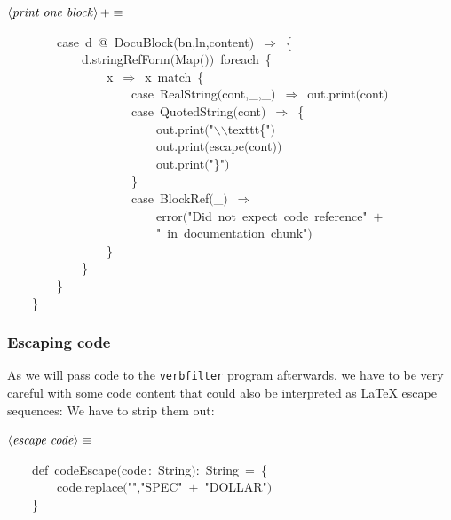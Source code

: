 \documentclass[a4paper,12pt]{article}
\begin{document}
$\left<\mbox{\emph{print one block}}\right>+\equiv$
\begin{program}~~~~~~~~{\vem case}~d~@~DocuBlock$($bn,ln,content$)$~$\Rightarrow$~{\small\{}
\\~~~~~~~~~~~~d.stringRefForm$($Map$($$)$$)$~foreach~{\small\{}
\\~~~~~~~~~~~~~~~~x~$\Rightarrow$~x~{\vem match}~{\small\{}
\\~~~~~~~~~~~~~~~~~~~~{\vem case}~RealString$($cont,\_,\_$)$~$\Rightarrow$~out.print$($cont$)$
\\~~~~~~~~~~~~~~~~~~~~{\vem case}~QuotedString$($cont$)$~$\Rightarrow$~{\small\{}
\\~~~~~~~~~~~~~~~~~~~~~~~~out.print$($"$\backslash$$\backslash$texttt{\small\{}"$)$
\\~~~~~~~~~~~~~~~~~~~~~~~~out.print$($escape$($cont$)$$)$
\\~~~~~~~~~~~~~~~~~~~~~~~~out.print$($"{\small\}}"$)$
\\~~~~~~~~~~~~~~~~~~~~{\small\}}
\\~~~~~~~~~~~~~~~~~~~~{\vem case}~BlockRef$($\_$)$~$\Rightarrow$
\\~~~~~~~~~~~~~~~~~~~~~~~~error$($"Did~not~expect~code~reference"~$+$
\\~~~~~~~~~~~~~~~~~~~~~~~~"~in~documentation~chunk"$)$
\\~~~~~~~~~~~~~~~~{\small\}}
\\~~~~~~~~~~~~{\small\}}
\\~~~~~~~~{\small\}}
\\~~~~{\small\}}
\\[0.5em]\end{program}


\subsubsection{Escaping code}
As we will pass code to the \texttt{verbfilter} program afterwards, we have to 
be very careful with some code content that could also be interpreted as
LaTeX escape sequences: We have to strip them out:

$\left<\mbox{\emph{escape code}}\right>\equiv$
\begin{program}~~~~{\vem def}~codeEscape$($code\,{\rm :}~String$)${\rm :}~String~=~{\small\{}
\\~~~~~~~~code.replace$($"\Dollar","SPEC"~$+$~"DOLLAR"$)$
\\~~~~{\small\}}
\\[0.5em]\end{program}
\end{document}
